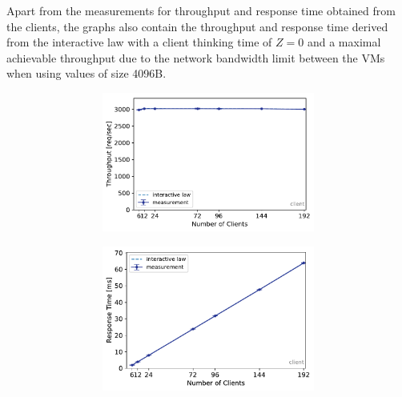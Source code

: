 \documentclass[report.tex]{subfiles}
\begin{document}
Apart from the measurements for throughput and response time obtained from the clients, the graphs also contain the throughput and response time derived from the interactive law with a client thinking time of $Z=0$ and a maximal achievable throughput due to the network bandwidth limit between the VMs when using values of size 4096B.

\begin{figure}[H]
\begin{subfigure}{\linewidth}
	\begin{subfigure}[b]{.49\linewidth}
		\centering
		\includegraphics[width=\linewidth]{data/exp21_ro_tp_nc.pdf}
	\end{subfigure}\hfill
	\begin{subfigure}[b]{.49\linewidth}
		\centering
		\includegraphics[width=\linewidth]{data/exp21_ro_rt_nc.pdf}
	\end{subfigure}%

\end{subfigure}
\end{figure}
\end{document}
